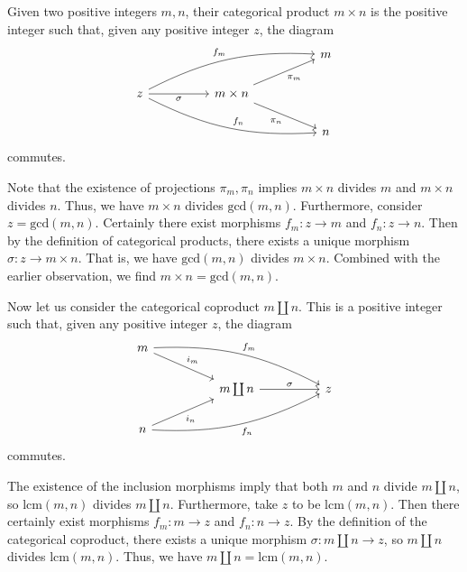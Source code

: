 \documentclass[../../master.tex]{subfiles}
\begin{document}
    \begin{solution}
      Given two positive integers \(m, n\), their categorical product \(m \times n\) is the positive integer such that, given any positive integer \(z\), the diagram
      \[
      \begin{tikzcd}
        &&&& {m} \\
        {z} && {m \times n} \\
        &&&& {n}
        \arrow["{\sigma}"', from=2-1, to=2-3]
        \arrow["{\pi_{m}}"', from=2-3, to=1-5]
        \arrow["{\pi_{n}}"', from=2-3, to=3-5]
        \arrow["{f_{m}}", from=2-1, to=1-5, bend left=15]
        \arrow["{f_{n}}", from=2-1, to=3-5, bend right=15]
      \end{tikzcd}
      \]
      commutes.

      Note that the existence of projections \(\pi_{m}, \pi_{n}\) implies \(m \times n\) divides \(m\) and \(m \times n\) divides \(n\).
      Thus, we have \(m \times n\) divides \(\text{gcd}(m, n)\).
      Furthermore, consider \(z = \text{gcd}(m, n)\).
      Certainly there exist morphisms \(f_{m}: z \to m\) and \(f_{n}: z \to n\).
      Then by the definition of categorical products, there exists a unique morphism \(\sigma: z \to m \times n\).
      That is, we have \(\text{gcd}(m, n)\) divides \(m \times n\).
      Combined with the earlier observation, we find \(m \times n = \text{gcd}(m, n)\).

      Now let us consider the categorical coproduct \(m \coprod n\).
      This is a positive integer such that, given any positive integer \(z\), the diagram
      \[
      \begin{tikzcd}
        {m} \\
        && {m \coprod n} && {z} \\
        {n}
        \arrow["{i_{m}}", from=1-1, to=2-3]
        \arrow["{i_{n}}"', from=3-1, to=2-3]
        \arrow["{\sigma}", from=2-3, to=2-5]
        \arrow["{f_{m}}", from=1-1, to=2-5, bend left=15]
        \arrow["{f_{n}}"', from=3-1, to=2-5, bend right=15]
      \end{tikzcd}
      \]
      commutes.

      The existence of the inclusion morphisms imply that both \(m\) and \(n\) divide \(m \coprod n\),
      so \(\text{lcm}(m, n)\) divides \(m \coprod n\).
      Furthermore, take \(z\) to be \(\text{lcm}(m, n)\).
      Then there certainly exist morphisms \(f_{m}: m \to z\) and \(f_{n}: n \to z\).
      By the definition of the categorical coproduct, there exists a unique morphism \(\sigma: m \coprod n \to z\), so \(m \coprod n\) divides \(\text{lcm}(m, n)\).
      Thus, we have \(m \coprod n = \text{lcm}(m, n)\).
    \end{solution}
\end{document}
